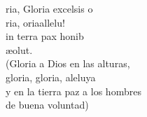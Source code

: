 \begin{cancion}%
	ria, Gloria  excelsis o\\
	ria, oriaallelu! \\
	in terra pax honib\\
	æolut.\\
(Gloria a Dios en las alturas, \\
 gloria, gloria, aleluya\\
 y en la tierra paz a los hombres \\
 de buena voluntad)\\
\end{cancion}%
